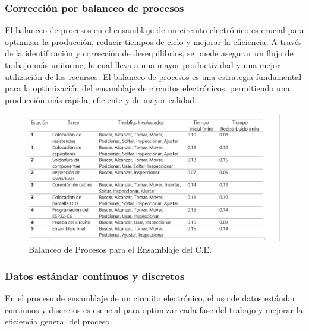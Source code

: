     \subsubsection{Corrección por balanceo de procesos}
    
    El balanceo de procesos en el ensamblaje de un circuito electrónico es crucial para optimizar la producción, reducir tiempos de ciclo y mejorar la eficiencia. A través de la identificación y corrección de desequilibrios, se puede asegurar un flujo de trabajo más uniforme, lo cual lleva a una mayor productividad y una mejor utilización de los recursos.
    El balanceo de procesos es una estrategia fundamental para la optimización del ensamblaje de circuitos electrónicos, permitiendo una producción más rápida, eficiente y de mayor calidad.\cite{Niebel}
    
    \begin{figure}[H]
        \centering
        \includegraphics[scale=0.30]{1/img/Balanceo de Procesos para el Ensamblaje del C.E..png}
        \caption{Balanceo de Procesos para el Ensamblaje del C.E.}
    \end{figure}
    
    \subsubsection{Datos estándar continuos y discretos}
    En el proceso de ensamblaje de un circuito electrónico, el uso de datos estándar continuos y discretos es esencial para optimizar cada fase del trabajo y mejorar la eficiencia general del proceso.
    
